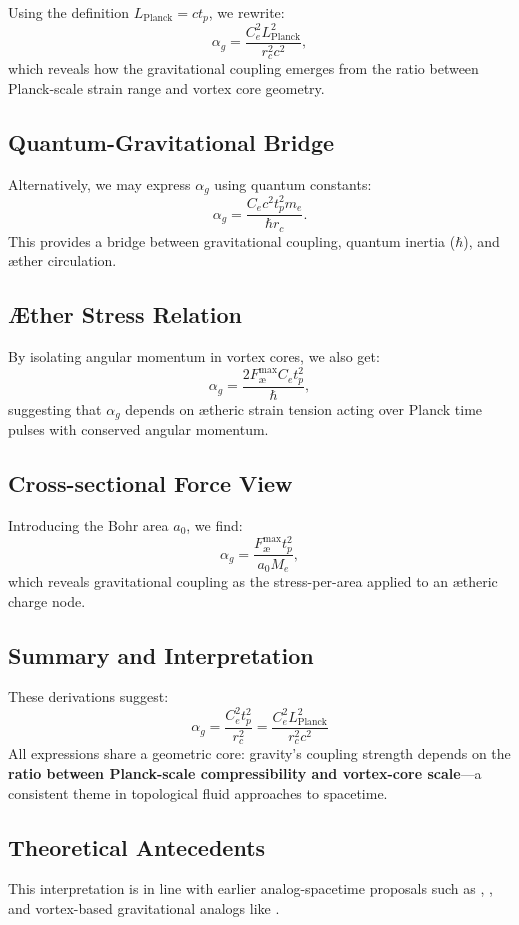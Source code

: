 Using the definition $L_{\text{Planck}} = c t_p$, we rewrite:
\[
    \alpha_g = \frac{C_e^2 L_{\text{Planck}}^2}{r_c^2 c^2},
\]
which reveals how the gravitational coupling emerges from the ratio between Planck-scale strain range and vortex core geometry.

\subsection{Quantum-Gravitational Bridge}

Alternatively, we may express $\alpha_g$ using quantum constants:
\[
    \alpha_g = \frac{C_e c^2 t_p^2 m_e}{\hbar r_c}.
\]
This provides a bridge between gravitational coupling, quantum inertia ($\hbar$), and æther circulation.

\subsection*{Æther Stress Relation}

By isolating angular momentum in vortex cores, we also get:
\[
    \alpha_g = \frac{2 F^{\text{max}}_{\text{\ae}} C_e t_p^2}{\hbar},
\]
suggesting that $\alpha_g$ depends on ætheric strain tension acting over Planck time pulses with conserved angular momentum.

\subsection*{Cross-sectional Force View}

Introducing the Bohr area $a_0$, we find:
\[
    \alpha_g = \frac{F^{\text{max}}_{\text{\ae}} t_p^2}{a_0 M_e},
\]
which reveals gravitational coupling as the stress-per-area applied to an ætheric charge node.

\subsection*{Summary and Interpretation}

These derivations suggest:
\[
    \boxed{
        \alpha_g = \frac{C_e^2 t_p^2}{r_c^2} = \frac{C_e^2 L_{\text{Planck}}^2}{r_c^2 c^2}
    }
\]
All expressions share a geometric core: gravity's coupling strength depends on the \textbf{ratio between Planck-scale compressibility and vortex-core scale}—a consistent theme in topological fluid approaches to spacetime.

\subsection*{Theoretical Antecedents}

This interpretation is in line with earlier analog-spacetime proposals such as \cite{barcelo2011}, \cite{volovik2003universe}, and vortex-based gravitational analogs like \cite{ranada1989topological}.
